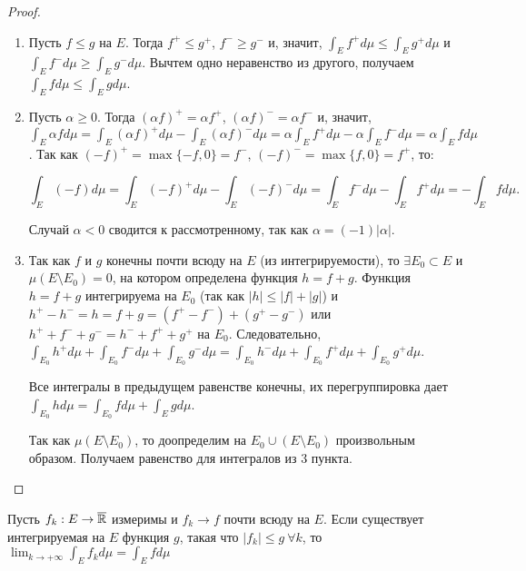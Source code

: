 \begin{proof}~

    \begin{enumerate}
    \item Пусть $f \leq g$ на $E$. Тогда $f^{+} \leq g^{+}$, $f^{-} \geq g^{-}$ и, значит, $\int_{E}f^{+} d\mu \leq \int_{E}g^{+} d\mu$ и $\int_{E}f^{-} d\mu \geq \int_{E}g^{-} d\mu$. Вычтем одно неравенство из другого, получаем $\int_{E}f d\mu \leq \int_{E}g d\mu$.
    
    \item Пусть $\alpha \geq 0$. Тогда $(\alpha f)^{+} = \alpha f^{+}$, $(\alpha f)^{-} = \alpha f^{-}$ и, значит, 
    $\int_{E}\alpha f d\mu = \int_{E}(\alpha f)^{+} d\mu - \int_{E}(\alpha f)^{-} d\mu = \alpha \int_{E}f^{+} d\mu - \alpha \int_{E}f^{-} d\mu = \alpha \int_{E}f d\mu$. Так как $(-f)^{+} = \max\{-f, 0\} = f^{-}$, $(-f)^{-} = \max\{f, 0\} = f^{+}$, то:
    
    \[\int_{E}(-f) d\mu = \int_{E}(-f)^{+} d\mu - \int_{E}(-f)^{-} d\mu = \int_{E}f^{-} d\mu - \int_{E}f^{+} d\mu = - \int_{E}f d\mu.\]
    
    Случай $\alpha < 0$ сводится к рассмотренному, так как $\alpha = (-1)|\alpha|$.
    \item Так как $f$ и $g$ конечны почти всюду на $E$ (из интегрируемости), то $\exists E_{0} \subset E$ и $\mu(E \setminus E_{0}) = 0$, на котором определена функция $h = f + g$. Функция $h = f + g$ интегрируема на $E_{0}$ (так как $|h| \leq |f| + |g|$) и $h^{+} - h^{-} = h = f + g = (f^{+} - f^{-}) + (g^{+} - g^{-})$ или $h^{+} + f^{-} + g^{-} = h^{-} + f^{+} + g^{+}$ на $E_{0}$. Следовательно, $\int_{E_{0}}h^{+} d\mu + \int_{E_{0}}f^{-} d\mu + \int_{E_{0}}g^{-} d\mu = \int_{E_{0}}h^{-} d\mu + \int_{E_{0}}f^{+} d\mu + \int_{E_{0}}g^{+} d\mu$.
    
    Все интегралы в предыдущем равенстве конечны, их перегруппировка дает $\int_{E_{0}}h d\mu = \int_{E_{0}}f d\mu + \int_{E}g d\mu$.
    
    Так как $\mu(E \setminus E_{0})$, то доопределим на $E_{0} \cup (E \setminus E_{0})$ произвольным образом. Получаем равенство для интегралов из 3 пункта.    
    \end{enumerate}
\end{proof}

\begin{theorem}[Лебег]
    Пусть $f_{k} : E \to \overline{\mathbb{R}}$ измеримы и $f_{k} \to f$ почти всюду на $E$. Если существует интегрируемая на $E$ функция $g$, такая что $|f_{k}| \leq g \ \forall k$, то $\lim_{k \to + \infty}\int_{E}f_{k} d\mu = \int_{E}f d\mu$ 
\end{theorem}


